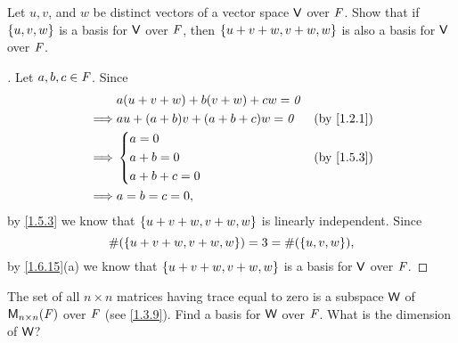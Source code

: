 \begin{ex}\label{ex:1.6.12}
  Let \(u, v\), and \(w\) be distinct vectors of a vector space \(\mathsf{V}\) over \(\mathit{F}\).
  Show that if \(\left\lbrace u, v, w\right\rbrace\) is a basis for \(\mathsf{V}\) over \(\mathit{F}\), then \(\left\lbrace u + v + w, v + w, w\right\rbrace\) is also a basis for \(\mathsf{V}\) over \(\mathit{F}\).
\end{ex}

\begin{proof}[]
  Let \(a, b, c \in \mathit{F}\).
  Since
  \begin{align*}
             & a(u + v + w) + b(v + w) + cw = \zv                               \\
    \implies & au + (a + b)v + (a + b + c)w = \zv &  & \text{(by \cref{1.2.1})} \\
    \implies & \begin{dcases}
                 a = 0     \\
                 a + b = 0 \\
                 a + b + c = 0
               \end{dcases}                     &  & \text{(by \cref{1.5.3})}   \\
    \implies & a = b = c = 0,
  \end{align*}
  by \cref{1.5.3} we know that \(\left\lbrace u + v + w, v + w, w\right\rbrace\) is linearly independent.
  Since
  \[
    \#(\left\lbrace u + v + w, v + w, w\right\rbrace) = 3 = \#(\left\lbrace u, v, w\right\rbrace),
  \]
  by \cref{1.6.15}(a) we know that \(\left\lbrace u + v + w, v + w, w\right\rbrace\) is a basis for \(\mathsf{V}\) over \(\mathit{F}\).
\end{proof}

\setcounter{ex}{14}
\begin{ex}\label{ex:1.6.15}
  The set of all \(n \times n\) matrices having trace equal to zero is a subspace \(\mathsf{W}\) of \(\mathsf{M}_{{n} \times n}({\mathit{F}})\) over \(\mathit{F}\) (see \cref{1.3.9}).
  Find a basis for \(\mathsf{W}\) over \(\mathit{F}\).
  What is the dimension of \(\mathsf{W}\)?
\end{ex}

